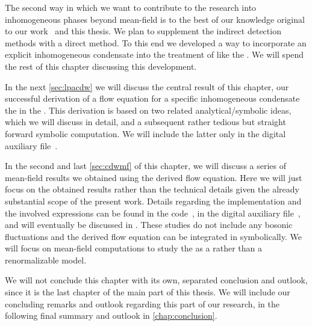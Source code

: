 The second way in which we want to contribute to the research into inhomogeneous phases beyond mean-field is to the best of our knowledge original to our work~\cite{Steil:2023RGMF} and this thesis.
We plan to supplement the indirect detection methods with a direct method.
To this end we developed a way to incorporate an explicit inhomogeneous condensate into the \frg{} treatment of \loefts{} like the \qmm{}. We will spend the rest of this chapter discussing this development.

In the next \cref{sec:lpacdw} we will discuss the central result of this chapter, \viz{} our successful derivation of a \lpa{} flow equation for a specific inhomogeneous condensate \dash{} the  \dash{} in the \qmm{}. This derivation is based on two related analytical/symbolic ideas, which we will discuss in detail, and a subsequent rather tedious but straight forward symbolic computation. We will include the latter only in the digital auxiliary file~\cite{Steil:2023qmmcdw}.

In the second and last \cref{sec:cdwmf} of this chapter, we will discuss a series of mean-field results we obtained using the derived flow equation.
Here we will just focus on the obtained results rather than the technical details given the already substantial scope of the present work.
Details regarding the implementation and the involved expressions can be found in the \Cpp{} code~\cite{Steil:2023QMcpp}, in the digital auxiliary file~\cite{Steil:2023qmmcdw}, and will eventually be discussed in .
These studies do not include any bosonic fluctuations and the derived flow equation can be integrated in \rgscale{} symbolically.
We will focus on \rgct{} mean-field computations to study the \qmm{} as a \loeft{} rather than a renormalizable model.

We will not conclude this chapter with its own, separated conclusion and outlook, since it is the last chapter of the main part of this thesis.
We will include our concluding remarks and outlook regarding this part of our research, in the following final summary and outlook in \cref{chap:conclusion}.

